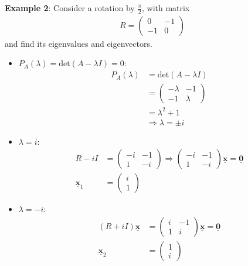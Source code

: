 \documentclass[10pt,a4paper]{article}
\begin{document}
\pagebreak

\textbf{Example 2}: Consider a rotation by $\frac{\pi}{2}$, with matrix
\begin{align*}
    R = \begin{pmatrix}
        0&-1 \\ 
        -1&0
    \end{pmatrix}
\end{align*}
and ﬁnd its eigenvalues and eigenvectors.

\begin{itemize}
    \item $P_A(\lambda) = \text{det}(A-\lambda I) = 0$:
    \begin{align*}
        P_A(\lambda) &= \text{det}(A-\lambda I) \\
        &= \begin{pmatrix}
            -\lambda & -1 \\
            -1 & \lambda
        \end{pmatrix} \\
        &= \lambda^2 + 1 \\
        &\Rightarrow \lambda = \pm i
    \end{align*}

    \item $\lambda = i$:
    \begin{align*}
        R-i I &= \left(\begin{array}{cc}
        -i & -1 \\
        1 & -i
        \end{array}\right) \Rightarrow\left(\begin{array}{cc}
        -i & -1 \\
        1 & -i
        \end{array}\right) \underline{\mathbf{x}}=\underline{\mathbf{0}} \\ 
        \underline{\mathbf{x}}_{1} &= \left(\begin{array}{l}
            i \\
            1
            \end{array}\right)
    \end{align*}

    \item $\lambda = -i$:
    \begin{align*}
        (R+i I) \underline{\mathbf{x}} &= \left(\begin{array}{cc}
            i & -1 \\
            1 & i
            \end{array}\right) \underline{\mathbf{x}}=\underline{\mathbf{0}} \\ 
        \underline{\mathbf{x}}_{2} &= \left(\begin{array}{l}
            1 \\
            i
            \end{array}\right)
    \end{align*}
\end{itemize}
\end{document}
